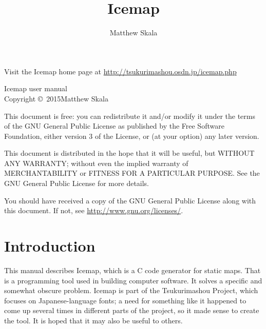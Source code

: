 \documentclass{mitsuba}
\title{Icemap}
\author{Matthew Skala}
\begin{document}
\maketitle


\begin{copyrightpage}
Visit the Icemap home page at
\url{http://tsukurimashou.osdn.jp/icemap.php}

\vspace*{1in}

Icemap user manual\\
Copyright \copyright\ 2015\quad Matthew Skala

\vspace{\baselineskip}

This document is free: you can redistribute it and/or modify
it under the terms of the GNU General Public License as published by
the Free Software Foundation, either version 3 of the License, or
(at your option) any later version.

\vspace{\baselineskip}

This document is distributed in the hope that it will be useful,
but WITHOUT ANY WARRANTY; without even the implied warranty of
MERCHANTABILITY or FITNESS FOR A PARTICULAR PURPOSE.  See the
GNU General Public License for more details.

\vspace{\baselineskip}

You should have received a copy of the GNU General Public License
along with this document.  If not, see \url{http://www.gnu.org/licenses/}.
\end{copyrightpage}


\tableofcontents


\chapter{Introduction}

This manual describes Icemap, which is a C code generator for static maps. 
That is a programming tool used in building computer software.  It solves a
specific and somewhat obscure problem.  Icemap is part of the Tsukurimashou
Project, which focuses on Japanese-language fonts; a need for something like
it happened to come up several times in different parts of the project, so
it made sense to create the tool.  It is hoped that it may also be useful to
others.
\end{document}
